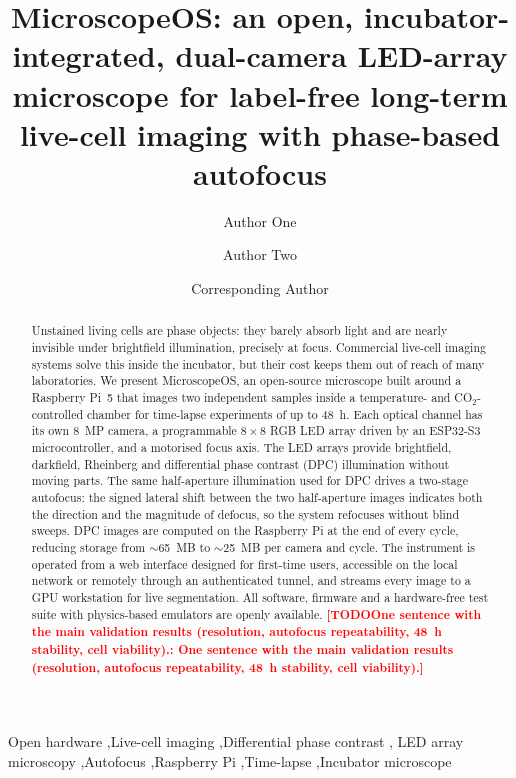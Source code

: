 \documentclass[preprint,12pt]{elsarticle}
\DeclareRobustCommand{\TODO}[1]{\textcolor{red}{\textbf{[TODO\ifx\relax#1\relax\else: #1\fi]}}}
\begin{document}
\begin{frontmatter}

\title{MicroscopeOS: an open, incubator-integrated, dual-camera LED-array
microscope for label-free long-term live-cell imaging with phase-based
autofocus}

\author[uanl]{Author One}
\author[uanl]{Author Two}
\author[uanl]{Corresponding Author}
\address[uanl]{Laboratory, Faculty, Universidad Autónoma de Nuevo León,
  City, Nuevo León, Mexico}

\begin{abstract}
Unstained living cells are phase objects: they barely absorb light and are
nearly invisible under brightfield illumination, precisely at focus.
Commercial live-cell imaging systems solve this inside the incubator, but
their cost keeps them out of reach of many laboratories. We present
MicroscopeOS, an open-source microscope built around a Raspberry Pi~5 that
images two independent samples inside a temperature- and CO$_2$-controlled
chamber for time-lapse experiments of up to 48~h. Each optical channel has
its own 8~MP camera, a programmable $8\times8$ RGB LED array driven by an
ESP32-S3 microcontroller, and a motorised focus axis. The LED arrays provide
brightfield, darkfield, Rheinberg and differential phase contrast (DPC)
illumination without moving parts. The same half-aperture illumination used
for DPC drives a two-stage autofocus: the signed lateral shift between the
two half-aperture images indicates both the direction and the magnitude of
defocus, so the system refocuses without blind sweeps. DPC images are
computed on the Raspberry Pi at the end of every cycle, reducing storage
from $\sim$65~MB to $\sim$25~MB per camera and cycle. The instrument is
operated from a web interface designed for first-time users, accessible on
the local network or remotely through an authenticated tunnel, and streams
every image to a GPU workstation for live segmentation. All software,
firmware and a hardware-free test suite with physics-based emulators are
openly available. \TODO{One sentence with the main validation results
(resolution, autofocus repeatability, 48~h stability, cell viability).}
\end{abstract}

\begin{keyword}
Open hardware \sep Live-cell imaging \sep Differential phase contrast \sep
LED array microscopy \sep Autofocus \sep Raspberry Pi \sep Time-lapse
\sep Incubator microscope
\end{keyword}

\end{frontmatter}
\end{document}
